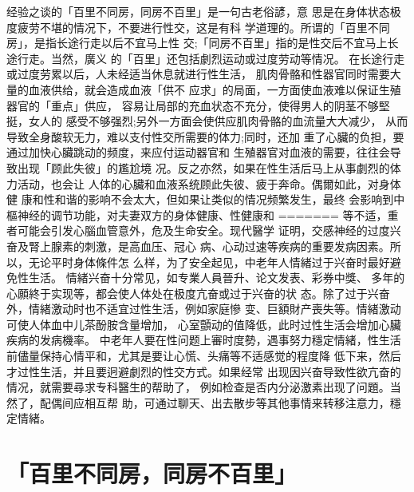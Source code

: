 \documentclass[12pt,UTF8]{ctexbook}
\begin{document}
经验之谈的「百里不同房，同房不百里」是一句古老俗諺，意
思是在身体状态极度疲劳不堪的情况下，不要进行性交，这是有科
学道理的。所谓的「百里不同房」，是指长途行走以后不宜马上性
交;「同房不百里」指的是性交后不宜马上长途行走。当然，廣义
的「百里」还包括劇烈运动或过度劳动等情况。
在长途行走或过度劳累以后，人未经适当休息就进行性生活，
肌肉骨骼和性器官同时需要大量的血液供给，就会造成血液「供不
应求」的局面，一方面使血液难以保证生殖器官的「重点」供应，
容易让局部的充血状态不充分，使得男人的阴茎不够堅挺，女人的
感受不够强烈;另外一方面会使供应肌肉骨骼的血流量大大减少，
从而导致全身酸软无力，难以支付性交所需要的体力;同时，还加
重了心臟的负担，要通过加快心臟跳动的频度，来应付运动器官和
生殖器官对血液的需要，往往会导致出现「顾此失彼」的尷尬境
况。反之亦然，如果在性生活后马上从事劇烈的体力活动，也会让
人体的心臟和血液系统顾此失彼、疲于奔命。偶爾如此，对身体健
康和性和谐的影响不会太大，但如果让类似的情况频繁发生，最终
会影响到中樞神经的调节功能，对夫妻双方的身体健康、性健康和
=======
等不适，重者可能会引发心腦血管意外，危及生命安全。现代醫学
证明，交感神经的过度兴奋及腎上腺素的刺激，是高血压、冠心
病、心动过速等疾病的重要发病因素。所以，无论平时身体條件怎
么样，为了安全起见，中老年人情緒过于兴奋时最好避免性生活。
情緒兴奋十分常见，如专業人員晉升、论文发表、彩券中獎、
多年的心願終于实现等，都会使人体处在极度亢奋或过于兴奋的状
态。除了过于兴奋外，情緒激动时也不适宜过性生活，例如家庭慘
变、巨額財产喪失等。情緒激动可使人体血中儿茶酚胺含量增加，
心室顫动的值降低，此时过性生活会增加心臟疾病的发病機率。
中老年人要在性问题上審时度勢，遇事努力穩定情緒，性生活
前儘量保持心情平和，尤其是要让心慌、头痛等不适感觉的程度降
低下来，然后才过性生活，并且要迥避劇烈的性交方式。如果经常
出现因兴奋导致性欲亢奋的情况，就需要尋求专科醫生的帮助了，
例如检查是否内分泌激素出现了问題。当然了，配偶间应相互帮
助，可通过聊天、出去散步等其他事情来转移注意力，穩定情緒。

\section{「百里不同房，同房不百里」}
\end{document}
